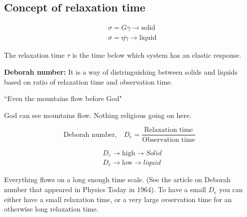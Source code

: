 \documentclass[a4paper]{article}
\begin{document}
\subsection*{Concept of relaxation time}
\begin{equation}
	\begin{split}
		&\sigma = G \gamma \to  \text{solid}\\
		&\sigma = \eta \dot{\gamma} \to \text{liquid}
	\end{split}
\end{equation}

The relaxation time $\tau$ is the time below which system has an
elastic response.

\textbf{Deborah number:} It is a way of distringuishing between
solids and liquids based on ratio of relaxation time and observation
time.

``Even the mountains flow before God"

God can see mountains flow. Nothing religious going on here.

\begin{equation}
	\text{Deborah number,}\quad D_e = \frac{\text{Relaxation time}}{\text{Observation time}}
\end{equation}

\begin{equation}
	\begin{split}
		&D_e \to  \text{high} \to Solid\\
		&D_e \to  \text{low} \to  liquid	
	\end{split}
\end{equation}

Everything flows on a long enough time scale. (See the article on Deborah number that
appeared in Physics Today in 1964). To have a small $D_e$ you can
either have a small relaxation time, or a very large ovservation time
for an otherwise long relaxation time.
	
\end{document}
